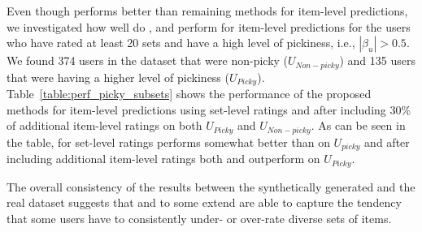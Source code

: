 Even though
\ARM performs better than remaining methods for item-level predictions, we investigated how
well do \ARM, \ES and \VO perform for item-level predictions for the users who have rated at least 20 sets and
have a high level of pickiness, i.e., $|\beta_u| > 0.5$. We found 374 users in the
dataset that were non-picky ($U_{Non-picky}$) and 135 users that were having a higher level of
pickiness ($U_{Picky}$). 
Table~\ref{table:perf_picky_subsets} shows the performance of the proposed
methods for item-level predictions using set-level ratings and after
including 30\% of additional item-level ratings on both $U_{Picky}$ and
$U_{Non-picky}$. As can be seen in the table, for set-level ratings
\VO performs somewhat better than \ARM on $U_{picky}$ and
after including additional item-level ratings  both \ES and \VO
outperform \ARM on $U_{Picky}$.

The overall consistency of the results between the synthetically generated and
the real dataset suggests that \VO and to some extend \ES 
are able to capture the tendency that some users have to consistently under- or
over-rate  diverse sets of items.


